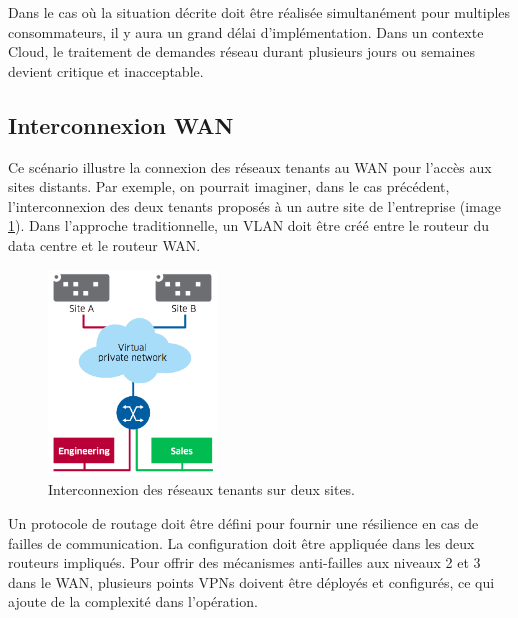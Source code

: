Dans le cas où la situation décrite doit être réalisée simultanément pour multiples consommateurs, il y aura un grand délai d'implémentation. Dans un contexte Cloud, le traitement de demandes réseau durant plusieurs jours ou semaines devient critique et inacceptable.  \cite{hpCloudEffectsOnNetworkLimitations} \cite{leveragingSDNCloudNetworkServiceExample} \cite{zkCloudArrived}


\subsection{Interconnexion WAN}

Ce scénario illustre la connexion des réseaux tenants au WAN pour l'accès aux sites distants. Par exemple, on pourrait imaginer, dans le cas précédent, l'interconnexion des deux tenants proposés à un autre site de l'entreprise (image \ref{InterconnexionWAN}). Dans l'approche traditionnelle, un VLAN doit être créé entre le routeur du data centre et le routeur WAN.



\begin{figure}[h]
\begin{center}
\includegraphics[width=0.4\textwidth]{images/InterconnexionWAN} 
\caption{Interconnexion des réseaux tenants sur deux sites. \cite{leveragingSDNCloudDCWAN}} \label{InterconnexionWAN}
\end{center}
\end{figure} 



Un protocole de routage doit être défini pour fournir une résilience en cas de failles de communication. La configuration doit être appliquée dans les deux routeurs impliqués. Pour offrir des mécanismes anti-failles aux niveaux 2 et 3 dans le WAN, plusieurs points VPNs doivent être déployés et configurés, ce qui ajoute de la complexité dans l'opération.

